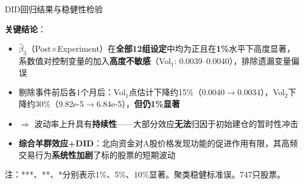 \documentclass[10pt, aspectratio=169]{beamer}
\begin{document}
\begin{frame}{DID回归结果与稳健性检验}
\vspace{0.3em}
\raggedright
\textbf{关键结论}：
\begin{itemize}\setlength\itemsep{0pt}
    \item $\hat{\beta}_3$（Post$\times$Experiment）在\textbf{全部12组设定}中均为正且在\textbf{1\%}水平下高度显著，系数值对控制变量的加入\textbf{高度不敏感}（Vol$_1$: 0.0039--0.0040），排除遗漏变量偏误
    \item 剔除事件前后各1个月后：Vol$_1$点估计下降约15\%（0.0040$\to$0.0034），Vol$_2$下降约30\%（9.82e-5$\to$6.84e-5），\textbf{但仍1\%显著}
    \item $\Rightarrow$ 波动率上升具有\textbf{持续性}——大部分效应\textbf{无法}归因于初始建仓的暂时性冲击
    \item \textbf{综合羊群效应+DID}：北向资金对A股价格发现功能的促进作用有限，其高频交易行为\textbf{系统性加剧}了标的股票的短期波动
\end{itemize}
{\tiny 注：***、**、*分别表示1\%、5\%、10\%显著。聚类稳健标准误。747只股票。}
\end{frame}
\end{document}
